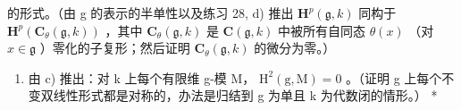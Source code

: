 的形式。（由 g 的表示的半单性以及练习 28, d) 推出 \(\mathbf{H}^p(\mathfrak{g}, k)\) 同构于 \(\mathbf{H}^p(\mathbf{C}_{\theta}(\mathfrak{g}, k))\) ，其中 \(\mathbf{C}_{\theta}(\mathfrak{g}, k)\) 是 \(\mathbf{C}(\mathfrak{g}, k)\) 中被所有自同态 \(\theta(x)\) （对 \(x \in \mathfrak{g}\) ）零化的子复形；然后证明 \(\mathbf{C}_{\theta}(\mathfrak{g}, k)\) 的微分为零。）

\begin{enumerate}
\def\labelenumi{\alph{enumi})}
\setcounter{enumi}{3}
\tightlist
\item
  由 c) 推出：对 k 上每个有限维 g-模 M， \(\mathrm{H}^{2}(\mathrm{g},\mathrm{M})=0\) 。（证明 g 上每个不变双线性形式都是对称的，办法是归结到 g 为单且 k 为代数闭的情形。） *
\end{enumerate}

